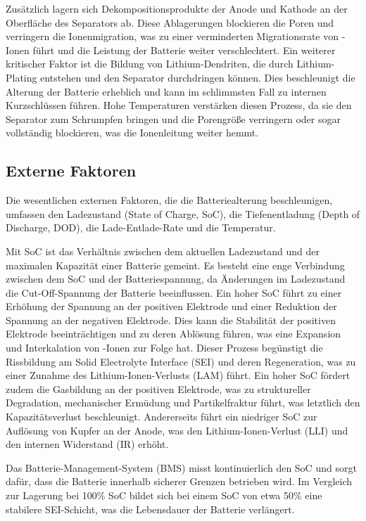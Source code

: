 Zusätzlich lagern sich Dekompositionsprodukte der Anode und Kathode an der Oberfläche des Separators ab. Diese Ablagerungen blockieren die Poren und verringern die Ionenmigration, was zu einer verminderten Migrationsrate von -Ionen führt und die Leistung der Batterie weiter verschlechtert. Ein weiterer kritischer Faktor ist die Bildung von Lithium-Dendriten, die durch Lithium-Plating entstehen und den Separator durchdringen können. Dies beschleunigt die Alterung der Batterie erheblich und kann im schlimmsten Fall zu internen Kurzschlüssen führen. Hohe Temperaturen verstärken diesen Prozess, da sie den Separator zum Schrumpfen bringen und die Porengröße verringern oder sogar vollständig blockieren, was die Ionenleitung weiter hemmt.



\subsection{Externe Faktoren}

Die wesentlichen externen Faktoren, die die Batteriealterung beschleunigen, umfassen den Ladezustand (State of Charge, SoC), die Tiefenentladung (Depth of Discharge, DOD), die Lade-Entlade-Rate und die Temperatur.

Mit SoC ist das Verhältnis zwischen dem aktuellen Ladezustand und der maximalen Kapazität einer Batterie gemeint. Es besteht eine enge Verbindung zwischen dem SoC und der Batteriespannung, da Änderungen im Ladezustand die Cut-Off-Spannung der Batterie beeinflussen. Ein hoher SoC führt zu einer Erhöhung der Spannung an der positiven Elektrode und einer Reduktion der Spannung an der negativen Elektrode. Dies kann die Stabilität der positiven Elektrode beeinträchtigen und zu deren Ablösung führen, was eine Expansion und Interkalation von -Ionen zur Folge hat. Dieser Prozess begünstigt die Rissbildung am Solid Electrolyte Interface (SEI) und deren Regeneration, was zu einer Zunahme des Lithium-Ionen-Verlusts (LAM) führt. Ein hoher SoC fördert zudem die Gasbildung an der positiven Elektrode, was zu struktureller Degradation, mechanischer Ermüdung und Partikelfraktur führt, was letztlich den Kapazitätsverlust beschleunigt. Andererseits führt ein niedriger SoC zur Auflösung von Kupfer an der Anode, was den Lithium-Ionen-Verlust (LLI) und den internen Widerstand (IR) erhöht.

Das Batterie-Management-System (BMS) misst kontinuierlich den SoC und sorgt dafür, dass die Batterie innerhalb sicherer Grenzen betrieben wird. Im Vergleich zur Lagerung bei 100\% SoC bildet sich bei einem SoC von etwa 50\% eine stabilere SEI-Schicht, was die Lebensdauer der Batterie verlängert.

